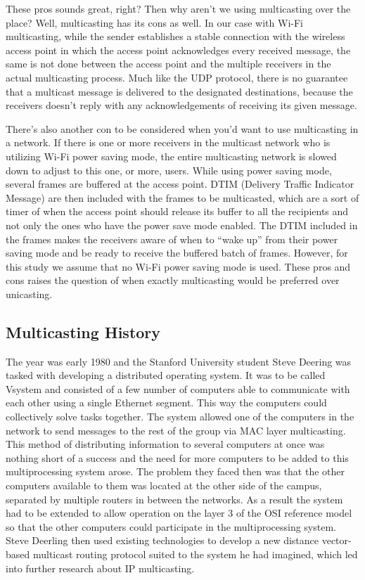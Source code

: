 \documentclass[9pt,a4paper]{acmproc}
\begin{document}
	These pros sounds great, right? Then why aren't we using multicasting over the place? Well, multicasting has its cons as well. In our case with Wi-Fi multicasting, while the sender establishes a stable connection with the wireless access point in which the access point acknowledges every received message, the same is not done between the access point and the multiple receivers in the actual multicasting process. Much like the UDP protocol, there is no guarantee that a multicast message is delivered to the designated destinations, because the receivers doesn't reply with any acknowledgements of receiving its given message. \cite{udpSource}
	
	There's also another con to be considered when you'd want to use multicasting in a network. If there is one or more receivers in the multicast network who is utilizing Wi-Fi power saving mode, the entire multicasting network is slowed down to adjust to this one, or more, users. While using power saving mode, several frames are buffered at the access point. DTIM (Delivery Traffic Indicator Message) are then included with the frames to be multicasted, which are a sort of timer of when the access point should release its buffer to all the recipients and not only the ones who have the power save mode enabled. The DTIM included in the frames makes the receivers aware of when to “wake up” from their power saving mode and be ready to receive the buffered batch of frames. \cite{impMult} 
However, for this study we assume that no Wi-Fi power saving mode is used. These pros and cons raises the question of when exactly multicasting would be preferred over unicasting.
\newline
\newline



\subsection{Multicasting History}

The year was early 1980 and the Stanford University student Steve Deering was tasked with developing a distributed operating system. It was to be called Vsystem and consisted of a few number of computers able to communicate with each other using a single Ethernet segment. This way the computers could collectively solve tasks together. The system allowed one of the computers in the network to send messages to the rest of the group via MAC layer multicasting. This method of distributing information to several computers at once was nothing short of a success and the need for more computers to be added to this multiprocessing system arose. The problem they faced then was that the other computers available to them was located at the other side of the campus, separated by multiple routers in between the networks. As a result the system had to be extended to allow operation on the layer 3 of the OSI reference model so that the other computers could participate in the multiprocessing system. Steve Deerling then used existing technologies to develop a new distance vector-based multicast routing protocol suited to the system he had imagined, which led into further research about IP multicasting. \cite[s.~7]{briefHist}
\end{document}
